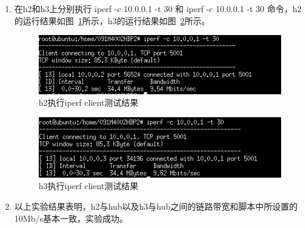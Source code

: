 \documentclass{zjureport}
\begin{document}
\begin{enumerate}
      \item \label{label:exe2result} 在h2和h3上分别执行 iperf -c 10.0.0.1 -t 30 和 iperf -c 10.0.0.1 -t 30 命令，h2的运行结果如图~\ref{fig:11}所示，h3的运行结果如图~\ref{fig:12}所示。
        \begin{figure}[!htbp]
          \centering
          \includegraphics[width=0.7\linewidth]{figures/11.jpg}
          \caption{h2执行iperf client测试结果}
          \label{fig:11}
        \end{figure}

        \begin{figure}[!htbp]
          \centering
          \includegraphics[width=0.7\linewidth]{figures/12.jpg}
          \caption{h3执行iperf client测试结果}
          \label{fig:12}
        \end{figure}

    \item 以上实验结果表明，h2与hub以及h3与hub之间的链路带宽和脚本中所设置的10Mb/s基本一致，实验成功。

  \end{enumerate}
\end{document}
